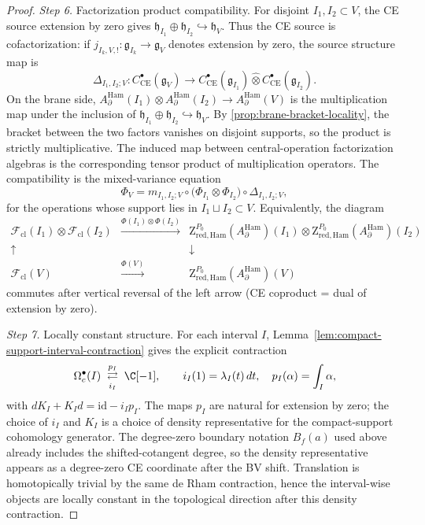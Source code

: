 \documentclass[11pt]{memoir}
\begin{document}
\begin{proof}
  \emph{Step 6.} Factorization product compatibility. For disjoint
  $I_1,I_2\subset V$, the CE source extension by zero gives
  $\mathfrak h_{I_1}\oplus\mathfrak h_{I_2}\hookrightarrow\mathfrak h_V$.
  Thus the CE source is cofactorization: if
  \(j_{I_k,V,!}:\mathfrak g_{I_k}\to\mathfrak g_V\) denotes extension by
  zero, the source structure map is
  \[
    \Delta_{I_1,I_2;V}\colon
    C^\bullet_{\mathrm{CE}}(\mathfrak g_V)\to
    C^\bullet_{\mathrm{CE}}(\mathfrak g_{I_1})\widehat\otimes
    C^\bullet_{\mathrm{CE}}(\mathfrak g_{I_2}).
  \]
  On the brane side,
  $A_\partial^{\mathrm{Ham}}(I_1)\otimes A_\partial^{\mathrm{Ham}}(I_2)
  \to A_\partial^{\mathrm{Ham}}(V)$ is the multiplication map under
  the inclusion of
  $\mathfrak h_{I_1}\oplus\mathfrak h_{I_2}\hookrightarrow\mathfrak h_V$.
  By \ref{prop:brane-bracket-locality}, the bracket between the two
  factors vanishes on disjoint supports, so the product is strictly
  multiplicative. The induced map between central-operation
  factorization algebras is the corresponding tensor product of
  multiplication operators. The compatibility is the mixed-variance
  equation
  \[
    \Phi_V
    =
    m_{I_1,I_2;V}\circ
    \bigl(\Phi_{I_1}\otimes\Phi_{I_2}\bigr)\circ
    \Delta_{I_1,I_2;V},
  \]
  for the operations whose support lies in \(I_1\sqcup I_2\subset V\).
  Equivalently, the diagram
  $$\begin{array}{ccc}
    \mathcal F_{\mathrm{cl}}(I_1)\otimes\mathcal F_{\mathrm{cl}}(I_2)
      &\xrightarrow{\Phi(I_1)\otimes\Phi(I_2)}
      & \mathrm Z^{P_0}_{\mathrm{red,Ham}}(A_\partial^{\mathrm{Ham}})(I_1)
        \otimes\mathrm Z^{P_0}_{\mathrm{red,Ham}}(A_\partial^{\mathrm{Ham}})(I_2)\\
    \uparrow & & \downarrow\\
    \mathcal F_{\mathrm{cl}}(V)
      &\xrightarrow{\Phi(V)}
      & \mathrm Z^{P_0}_{\mathrm{red,Ham}}(A_\partial^{\mathrm{Ham}})(V)
  \end{array}$$
  commutes after vertical reversal of the left arrow (CE coproduct =
  dual of extension by zero).

  \emph{Step 7.} Locally constant structure. For each interval \(I\),
  Lemma~\ref{lem:compact-support-interval-contraction} gives the
  explicit contraction
  \[
    \Omega_c^\bullet(I)
      \;\underset{i_I}{\stackrel{p_I}{\rightleftarrows}}\;
    \C[-1],
    \qquad
    i_I(1)=\lambda_I(t)\,dt,\quad
    p_I(\alpha)=\int_I\alpha,
  \]
  with \(dK_I+K_I d=\mathrm{id}-i_Ip_I\). The maps \(p_I\) are natural for
  extension by zero; the choice of \(i_I\) and \(K_I\) is a choice of
  density representative for the compact-support cohomology generator.
  The
  degree-zero boundary notation \(B_f(a)\) used above already includes
  the shifted-cotangent degree, so the density representative appears as
  a degree-zero CE coordinate after the BV shift.  Translation is
  homotopically trivial by the same de Rham contraction, hence the
  interval-wise objects are locally constant in the topological direction
  after this density contraction.


\end{proof}
\end{document}
